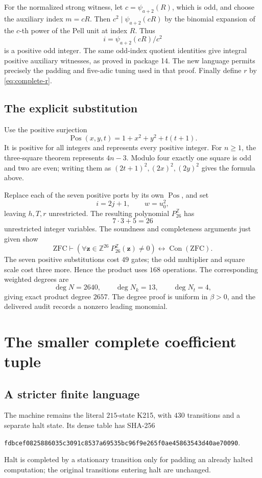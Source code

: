 \documentclass[11pt]{article}
\theoremstyle{remark}\newtheorem{remark}[theorem]{Remark}
\newcommand{\Z}{\mathbb Z}
\newcommand{\Con}{\operatorname{Con}}
\begin{document}
For the normalized strong witness, let
\(c=\psi_{a+2}(R)\), which is odd, and choose the auxiliary
index \(m=cR\). Then \(c^2\mid\psi_{a+2}(cR)\) by the binomial
expansion of the \(c\)-th power of the Pell unit at index \(R\).
Thus
\[
 i=\psi_{a+2}(cR)/c^2
\]
is a positive odd integer. The same odd-index quotient identities
give integral positive auxiliary witnesses, as proved in package 14.
The new language permits precisely the padding and five-adic tuning
used in that proof. Finally define \(r\) by \eqref{eq:complete-r}.

\subsection{The explicit substitution}

Use the positive surjection
\[
 \operatorname{Pos}(x,y,t)=1+x^2+y^2+t(t+1).
\]
It is positive for all integers and represents every positive integer.
For \(n\ge1\), the three-square theorem represents \(4n-3\).
Modulo four exactly one square is odd and two are even; writing
them as \((2t+1)^2,(2x)^2,(2y)^2\) gives the formula above.

Replace each of the seven positive ports by its own
\(\operatorname{Pos}\), and set
\[
 i=2j+1,\qquad w=u_0^2,
\]
leaving \(h,T,r\) unrestricted. The resulting polynomial
\(P_{26}^{\Z}\) has
\[
 7\cdot3+5=26
\]
unrestricted integer variables. The soundness and completeness
arguments just given show
\[
 \mathrm{ZFC}\vdash
 \left(\forall\mathbf z\in\Z^{26}\ P_{26}^{\Z}(\mathbf z)\ne0\right)
 \longleftrightarrow\Con(\mathrm{ZFC}).
\]
The seven positive substitutions cost \(49\) gates; the odd multiplier
and square scale cost three more. Hence the product uses \(168\)
operations. The corresponding weighted degrees are
\[
 \deg N=2640,\qquad \deg N_k=13,\qquad \deg N_t=4,
\]
giving exact product degree \(2657\).
The degree proof is uniform in \(\beta>0\), and the delivered audit
records a nonzero leading monomial.

\section{The smaller complete coefficient tuple}\label{sec:coefficients}

\subsection{A stricter finite language}

The machine remains the literal \(215\)-state K215, with \(430\)
transitions and a separate halt state. Its dense table has SHA-256
\begin{center}\scriptsize
\texttt{fdbcef0825886035c3091c8537a69535bc96f9e265f0ae45863543d40ae70090}.
\end{center}
Halt is completed by a stationary transition only for padding an
already halted computation; the original transitions entering halt
are unchanged.
\end{document}
